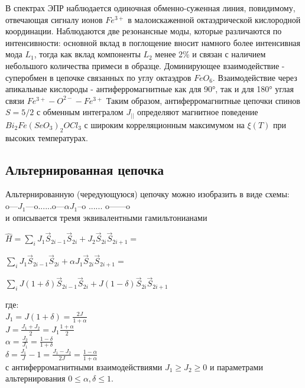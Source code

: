 \documentclass[11pt]{article}
\begin{document}
В спектрах ЭПР наблюдается одиночная обменно-суженная линия, повидимому, отвечающая сигналу ионов $Fe^{3+}$ в малоискаженной октаэдрической кислородной координации. Наблюдаются две резонансные моды, которые различаются по интенсивности: основной вклад в поглощение вносит намного более интенсивная мода $L_1$, тогда как вклад компоненты $L_2$ менее 2\% и связан с наличием небольшого количества примеси в образце. Доминирующее взаимодействие - суперобмен в цепочке связанных по углу октаэдров $FeO_6$. Взаимодействие через апикальные кислороды - антиферромагнитные как для 90°, так и для 180° углая связи $Fe^{3+} - O^{2-} - Fe^{3+}$ Таким образом, антиферромагнитные цепочки спинов $S=5/2$ с обменным интегралом $J_{||}$ определяют магнитное поведение $Bi_2Fe(SeO_3)_2OCl_3$ с широким корреляционным максимумом на $\xi(T)$ при высоких температурах.~\cite{nm}

\subsection{Альтернированная цепочка}
Альтернированную (чередующуюся) цепочку можно изобразить в виде схемы: \\

o---$J_1$---o......o---$\alpha J_1$--o ...... o------o \\
 
и описывается тремя эквивалентными гамильтонианами ~\cite{johnston2000}

$\hat H = \sum_iJ_1 \vec S_{2i-1} \vec S_{2i} + J_2 \vec S_{2i} \vec S_{2i+1} = $ 
 
$\sum_i J_1 \vec S_{2i-1} \vec S_{2i} + \alpha J_1 \vec S_{2i} \vec S_{2i+1} = $ 
 
$\sum_i J(1+\delta ) \vec S_{2i-1} \vec S_{2i} + J(1-\delta ) \vec S_{2i} \vec S_{2i+1}$  
 
где: \\
 
$J_1=J(1+\delta) = \frac{2J}{1+\alpha}$ \\

$J = \frac{J_1+J_2}{2} = J_1\frac{1+\alpha}{2}$ \\
 
$\alpha=\frac{J_2}{J_1}=\frac{1-\delta}{1+\delta} $\\
 
$\delta=\frac{J_1}{J}-1 = \frac{J_1-J_2}{2J} = \frac{1-\alpha}{1+\alpha}$ \\
 
с антиферромагнитными взаимодействиями $J_1 \ge J_2 \ge 0$ и параметрами альтернирования $ 0 \le \alpha, \delta \le 1 $. 
 
\end{document}
